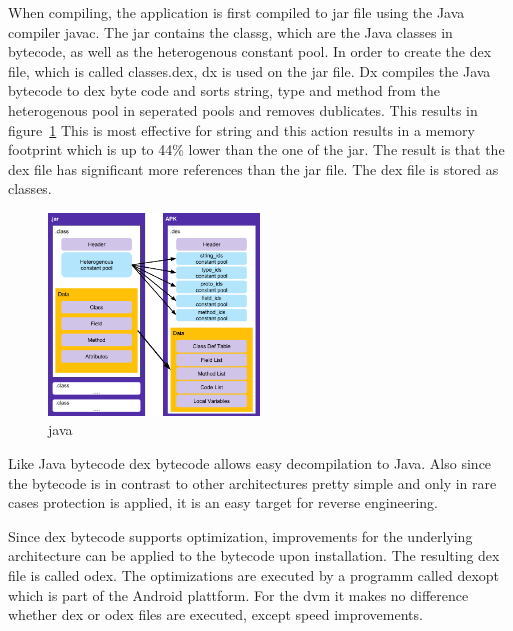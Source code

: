 When compiling, the application is first compiled to \gls{jar} file using the Java compiler javac.
The jar contains the \gls{classg}, which are the Java classes in bytecode, as well as the heterogenous constant pool.
In order to create the dex file, which is called classes.dex, dx is used on the \gls{jar} file.
Dx compiles the Java bytecode to \gls{dex} byte code and sorts string, type and method from the heterogenous pool in seperated pools and removes dublicates.
This results in figure~\ref{fig:java}
This is most effective for string and this action results in a memory footprint which is up to 44\% lower than the one of the \gls{jar}.
The result is that the \gls{dex} file has significant more references than the \gls{jar} file.
The \gls{dex} file is stored as classes.\cite{ehringerDalvik}
\begin{figure}[h]
    \centering
    \includegraphics[width=0.5\textwidth]{data/java.png}
    \caption{java}
    \label{fig:java}
\end{figure}
Like Java bytecode \gls{dex} bytecode allows easy decompilation to Java.
Also since the bytecode is in contrast to other architectures pretty simple and only in rare cases protection is applied, it is an easy target for reverse engineering.

Since \gls{dex} bytecode supports optimization, improvements for the underlying architecture can be applied to the bytecode upon installation.
The resulting \gls{dex} file is called \gls{odex}.
The optimizations are executed by a programm called dexopt which is part of the Android plattform.
For the \gls{dvm} it makes no difference whether \gls{dex} or \gls{odex} files are executed, except speed improvements.
%




